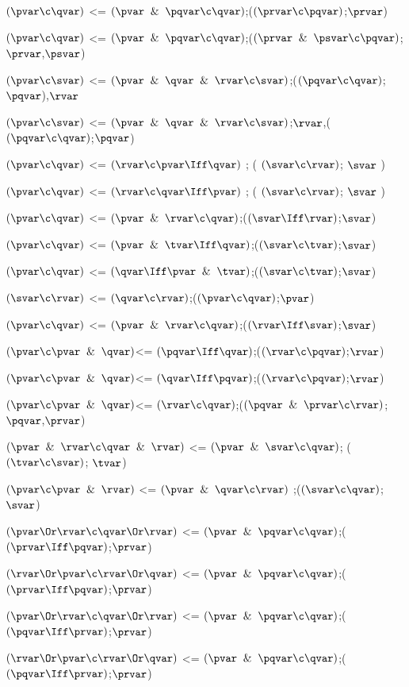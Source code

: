 $(\pvar \c \qvar)$ <= $(\pvar \And \pqvar \c \qvar)$;($(\prvar \c \pqvar)$;$\prvar$)

$(\pvar \c \qvar)$ <= $(\pvar \And \pqvar \c \qvar)$;($(\prvar \And \psvar \c \pqvar)$;$\prvar$,$\psvar$)

$(\pvar \c \svar)$ <= $(\pvar \And \qvar \And \rvar \c \svar)$;($(\pqvar \c \qvar)$;$\pqvar$),$\rvar$

$(\pvar \c \svar)$ <= $(\pvar \And \qvar \And \rvar \c \svar)$;$\rvar$,($(\pqvar \c \qvar)$;$\pqvar$)

$(\pvar \c \qvar)$ <= $(\rvar \c \pvar \Iff \qvar)$ ; ( $(\svar \c \rvar)$; $\svar$ )

$(\pvar \c \qvar)$ <= $(\rvar \c \qvar \Iff \pvar)$ ; ( $(\svar \c \rvar)$; $\svar$ )

$(\pvar \c \qvar)$ <= $(\pvar \And \rvar \c \qvar)$;($(\svar \Iff \rvar)$;$\svar$)

$(\pvar \c \qvar)$ <= $(\pvar \And \tvar\Iff \qvar)$;($(\svar \c \tvar)$;$\svar$)

$(\pvar \c \qvar)$ <= $(\qvar \Iff \pvar \And \tvar)$;($(\svar \c \tvar)$;$\svar$)

$(\svar \c \rvar)$ <= $(\qvar \c \rvar)$;($(\pvar \c \qvar)$;$\pvar$)

$(\pvar \c \qvar)$ <= $(\pvar \And \rvar \c \qvar)$;($(\rvar \Iff \svar)$;$\svar$)

$(\pvar \c \pvar \And \qvar)$<= $(\pqvar \Iff \qvar)$;($(\rvar \c \pqvar)$;$\rvar$)

$(\pvar \c \pvar \And \qvar)$<= $(\qvar \Iff \pqvar)$;($(\rvar \c \pqvar)$;$\rvar$)

$(\pvar \c \pvar \And \qvar)$<= $(\rvar \c \qvar)$;($(\pqvar \And \prvar \c \rvar)$;$\pqvar$,$\prvar$)

$(\pvar \And \rvar \c \qvar \And \rvar)$ <= $(\pvar \And \svar \c \qvar)$; ($(\tvar \c \svar)$; $\tvar$)

$(\pvar \c \pvar \And \rvar)$ <= $(\pvar \And \qvar \c \rvar)$ ;($(\svar \c \qvar)$; $\svar$)

$(\pvar \Or \rvar\c \qvar\Or \rvar)$ <= $(\pvar \And \pqvar \c \qvar)$;($(\prvar \Iff \pqvar)$;$\prvar$)

$(\rvar \Or \pvar \c\rvar \Or  \qvar)$ <= $(\pvar \And \pqvar \c \qvar)$;($(\prvar \Iff \pqvar)$;$\prvar$)

$(\pvar \Or \rvar\c \qvar\Or \rvar)$ <= $(\pvar \And \pqvar \c \qvar)$;($(\pqvar \Iff \prvar)$;$\prvar$)

$(\rvar \Or \pvar \c\rvar \Or  \qvar)$ <= $(\pvar \And \pqvar \c \qvar)$;($(\pqvar \Iff \prvar)$;$\prvar$)


